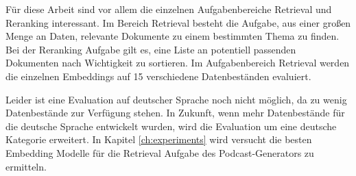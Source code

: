 Für diese Arbeit sind vor allem die einzelnen Aufgabenbereiche Retrieval und Reranking interessant. Im Bereich Retrieval besteht die Aufgabe, aus einer großen Menge an Daten, relevante Dokumente zu einem bestimmten Thema zu finden.
Bei der Reranking Aufgabe gilt es, eine Liste an potentiell passenden Dokumenten nach Wichtigkeit zu sortieren.
Im Aufgabenbereich Retrieval werden die einzelnen Embeddings auf 15 verschiedene Datenbeständen evaluiert.
\cite{muennighoff2023}

Leider ist eine Evaluation auf deutscher Sprache noch nicht möglich, da zu wenig Datenbestände zur Verfügung stehen. 
In Zukunft, wenn mehr Datenbestände für die deutsche Sprache entwickelt wurden, wird die Evaluation um eine deutsche Kategorie erweitert. \cite{muennighoff2023a}
In Kapitel \autoref{ch:experiments} wird versucht die besten Embedding Modelle für die Retrieval Aufgabe des Podcast-Generators zu ermitteln.





